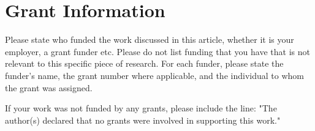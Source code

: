 \section*{Grant Information}
Please state who funded the work discussed in this article, whether it is your employer, a grant funder etc. Please do not list funding that you have that is not relevant to this specific piece of research. For each funder, please state the funder’s name, the grant number where applicable, and the individual to whom the grant was assigned.

If your work was not funded by any grants, please include the line: "The author(s) declared that no grants were involved in supporting this work."